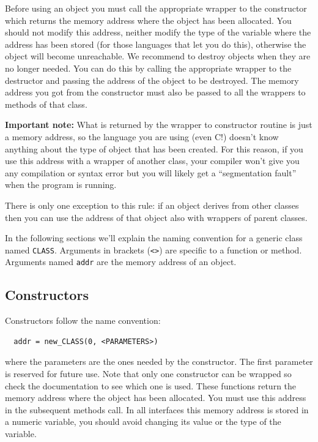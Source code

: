 \documentclass[12pt,titlepage]{article}
\begin{document}
\bigskip
Before using an object you must call the appropriate wrapper to the
constructor which returns the memory address where the object has been
allocated. You should not modify this address, neither modify the type
of the variable where the address has been stored (for those languages
that let you do this), otherwise the object will become
unreachable. We recommend to destroy objects when they are no longer
needed. You can do this by calling the appropriate wrapper to the
destructor and passing the address of the object to be destroyed. The
memory address you got from the constructor must also be passed to all
the wrappers to methods of that class.

\begin{framed}
\textbf{Important note:} What is returned by the wrapper to
constructor routine is just a memory address, so the language you are
using (even C!)  doesn't know anything about the type of object that
has been created. For this reason, if you use this address with a
wrapper of another class, your compiler won't give you any compilation
or syntax error but you will likely get a ``segmentation fault'' when the
program is running.
\end{framed}

\noindent There is only one exception to this rule: if an object
derives from other classes then you can use the address of that
object also with wrappers of parent classes.

\noindent In the following sections we'll explain the naming
convention for a generic class named \verb|CLASS|. Arguments in
brackets (\verb|<>|) are specific to a function or method. Arguments
named \verb|addr| are the memory address of an object.

\subsection{Constructors}
\label{ssec-Constructors}
Constructors follow the name convention:
%
\begin{verbatim}
  addr = new_CLASS(0, <PARAMETERS>)
\end{verbatim}
%
where the parameters are the ones needed by the constructor. The first
parameter is reserved for future use. Note that only one constructor
can be wrapped so check the documentation to see which one is
used. These functions return the memory address where the object has
been allocated. You must use this address in the subsequent methods
call. In all interfaces this memory address is stored in a numeric
variable, you should avoid changing its value or the type of the
variable.
\end{document}
